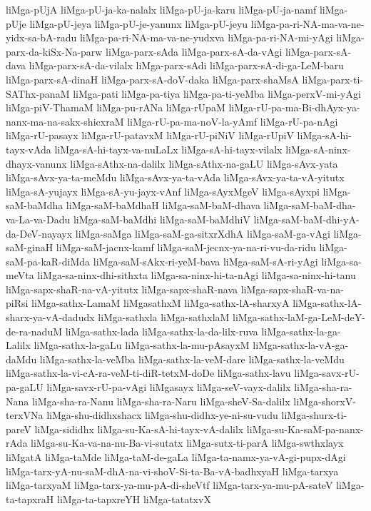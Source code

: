 {liMga-pUjA
liMga-pU-ja-ka-nalalx
liMga-pU-ja-karu
liMga-pU-ja-namf
liMga-pUje
liMga-pU-jeya
liMga-pU-je-yanunx
liMga-pU-jeyu
liMga-pa-ri-NA-ma-va-ne-yidx-sa-bA-radu
liMga-pa-ri-NA-ma-va-ne-yudxva
liMga-pa-ri-NA-mi-yAgi
liMga-parx-da-kiSx-Na-parw
liMga-parx-sAda
liMga-parx-sA-da-vAgi
liMga-parx-sA-dava
liMga-parx-sA-da-vilalx
liMga-parx-sAdi
liMga-parx-sA-di-ga-LeM-baru
liMga-parx-sA-dinaH
liMga-parx-sA-doV-daka
liMga-parx-shaMsA
liMga-parx-ti-SAThx-panaM
liMga-pati
liMga-pa-tiya
liMga-pa-ti-yeMba
liMga-perxV-mi-yAgi
liMga-piV-ThamaM
liMga-pu-rANa
liMga-rUpaM
liMga-rU-pa-ma-Bi-dhAyx-ya-nanx-ma-na-sakx-shicxraM
liMga-rU-pa-ma-noV-la-yAmf
liMga-rU-pa-nAgi
liMga-rU-pasayx
liMga-rU-patavxM
liMga-rU-piNiV
liMga-rUpiV
liMga-sA-hi-tayx-vAda
liMga-sA-hi-tayx-va-nuLaLx
liMga-sA-hi-tayx-vilalx
liMga-sA-ninx-dhayx-vanunx
liMga-sAthx-na-dalilx
liMga-sAthx-na-gaLU
liMga-sAvx-yata
liMga-sAvx-ya-ta-meMdu
liMga-sAvx-ya-ta-vAda
liMga-sAvx-ya-ta-vA-yitutx
liMga-sA-yujayx
liMga-sA-yu-jayx-vAnf
liMga-sAyxMgeV
liMga-sAyxpi
liMga-saM-baMdha
liMga-saM-baMdhaH
liMga-saM-baM-dhava
liMga-saM-baM-dha-va-La-va-Dadu
liMga-saM-baMdhi
liMga-saM-baMdhiV
liMga-saM-baM-dhi-yA-da-DeV-nayayx
liMga-saMga
liMga-saM-ga-sitxrXdhA
liMga-saM-ga-vAgi
liMga-saM-ginaH
liMga-saM-jacnx-kamf
liMga-saM-jecnx-ya-na-ri-vu-da-ridu
liMga-saM-pa-kaR-diMda
liMga-saM-sAkx-ri-yeM-bava
liMga-saM-sA-ri-yAgi
liMga-sa-meVta
liMga-sa-ninx-dhi-sithxta
liMga-sa-ninx-hi-ta-nAgi
liMga-sa-ninx-hi-tanu
liMga-sapx-shaR-na-vA-yitutx
liMga-sapx-shaR-nava
liMga-sapx-shaR-va-na-piRsi
liMga-sathx-LamaM
liMgasathxM
liMga-sathx-lA-sharxyA
liMga-sathx-lA-sharx-ya-vA-dadudx
liMga-sathxla
liMga-sathxlaM
liMga-sathx-laM-ga-LeM-deY-de-ra-naduM
liMga-sathx-lada
liMga-sathx-la-da-lilx-ruva
liMga-sathx-la-ga-Lalilx
liMga-sathx-la-gaLu
liMga-sathx-la-mu-pAsayxM
liMga-sathx-la-vA-ga-daMdu
liMga-sathx-la-veMba
liMga-sathx-la-veM-dare
liMga-sathx-la-veMdu
liMga-sathx-la-vi-cA-ra-veM-ti-diR-tetxM-doDe
liMga-sathx-lavu
liMga-savx-rU-pa-gaLU
liMga-savx-rU-pa-vAgi
liMgasayx
liMga-seV-vayx-dalilx
liMga-sha-ra-Nana
liMga-sha-ra-Nanu
liMga-sha-ra-Naru
liMga-sheV-Sa-dalilx
liMga-shorxV-terxVNa
liMga-shu-didhxshacx
liMga-shu-didhx-ye-ni-su-vudu
liMga-shurx-ti-pareV
liMga-sididhx
liMga-su-Ka-sA-hi-tayx-vA-dalilx
liMga-su-Ka-saM-pa-nanx-rAda
liMga-su-Ka-va-na-nu-Ba-vi-sutatx
liMga-sutx-ti-parA
liMga-swthxlayx
liMgatA
liMga-taMde
liMga-taM-de-gaLa
liMga-ta-namx-ya-vA-gi-pupx-dAgi
liMga-tarx-yA-nu-saM-dhA-na-vi-shoV-Si-ta-Ba-vA-badhxyaH
liMga-tarxya
liMga-tarxyaM
liMga-tarx-ya-mu-pA-di-sheVtf
liMga-tarx-ya-mu-pA-sateV
liMga-ta-tapxraH
liMga-ta-tapxreYH
liMga-tatatxvX
}
